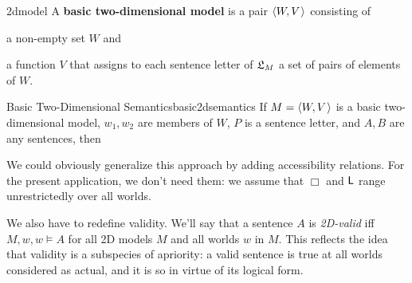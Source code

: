 \begin{definition}{}{2dmodel}
  A \textbf{basic two-dimensional model} is a pair $\t{W,V}$ consisting of%
  \vspace{-3mm}
  \begin{itemize*}
  \item a non-empty set $W$ and
  \item a function $V$ that assigns to each sentence letter of $\mathfrak{L}_M$
  a set of pairs of elements of $W$.
  \end{itemize*}
\end{definition}

\begin{definition}{Basic Two-Dimensional Semantics}{basic2dsemantics}
  If $M = \t{W,V}$ is a basic two-dimensional model, $w_{1},w_{2}$ are members of $W$, $P$ is
  a sentence letter, and $A,B$ are any sentences, then

  \medskip
  \begin{semantics}
  \end{semantics}

\end{definition}

We could obviously generalize this approach by adding accessibility relations.
For the present application, we don't need them:
we assume that $\Box$ and $\operatorname{\mathsf{L}}$ range unrestrictedly over all worlds.

We also have to redefine validity.
We'll say that a sentence $A$ is \emph{2D-valid} iff $M,w,w \models A$ for all 2D models $M$ and all worlds $w$ in $M$.
This reflects the idea that validity is a subspecies of apriority: a valid
sentence is true at all worlds considered as actual, and it is so in virtue of
its logical form.

